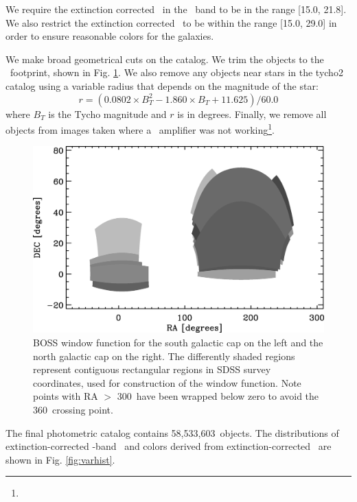 \documentclass[preprint]{aastex}
\newcommand{\modelrmin}{15.0}
\newcommand{\modelrmax}{29.0}
\newcommand{\rmin}{15.0}
\newcommand{\rmax}{21.8}
\newcommand{\nphoto}{58,533,603}
\begin{document}
We require the extinction corrected \citep{Schlegel98} \cmodelmag\ in the \rmag\
band to be in the range [\rmin, \rmax].  We also restrict the extinction corrected
\modelmag\ to be within the range [\modelrmin, \modelrmax] in order to ensure
reasonable colors for the galaxies.

We make broad geometrical cuts on the catalog.  We trim the objects to the
\boss\ footprint, shown in Fig. \ref{fig:footprint}. We also remove any
objects near stars in the tycho2 catalog \citep{tycho2} using a variable radius
that depends on the magnitude of the star:
\begin{equation}
r = (0.0802\times B_T^2 - 1.860\times B_T + 11.625)/60.0
\end{equation}
where $B_T$ is the Tycho magnitude and $r$ is in degrees.  Finally, we remove
all objects from images taken where a \umag\ amplifier was not working\footnote{\DRsevcaveat}.

\begin{figure}[t] \centering
 \centering 
 \includegraphics[scale=0.6]{figures/boss-poly-coverage.eps}

 \caption{BOSS window function for the south galactic cap on the left and the
 north galactic cap on the right.  The differently shaded regions represent
 contiguous rectangular regions in SDSS survey coordinates, used for
 construction of the window function.  Note points with RA $>$ 300\arcdeg\ have
 been wrapped below zero to avoid the 360\arcdeg\ crossing point.}
 \label{fig:footprint}

\end{figure}

The final photometric catalog contains \nphoto\ objects.  The distributions of
extinction-corrected \rmag-band \cmodelmag\ and colors derived from
extinction-corrected \modelmag\ are shown in Fig. \ref{fig:varhist}.
\end{document}
